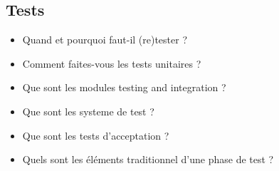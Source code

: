 \subsection{Tests}


\begin{itemize}
	\item Quand et pourquoi faut-il (re)tester ?
	\item Comment faites-vous les tests unitaires ?
	\item Que sont les modules testing and integration ?
	\item Que sont les systeme de test ?
	\item Que sont les tests d'acceptation ?
	\item Quels sont les éléments traditionnel d'une phase de test ?
\end{itemize}